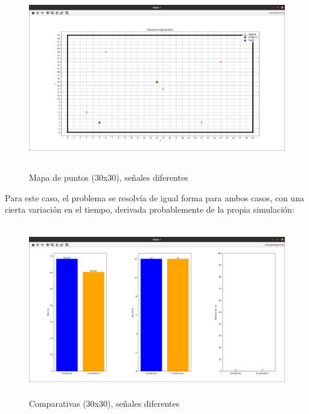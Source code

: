 \begin{figure} [H]
    \begin{center}
    \includegraphics[height=8cm]{imagenes/cap4/25_mapa_p_diff.png}
    \end{center}
    \caption[Mapa de puntos (30x30), señales diferentes]{Mapa de puntos (30x30), señales diferentes}
    \label{fig:map_p_diff_30}
\end{figure}

Para este caso, el problema se resolvía de igual forma para ambos casos, con una cierta variación en el tiempo, derivada probablemente de la propia simulación:\\

\begin{figure} [H]
    \begin{center}
    \includegraphics[height=7.5cm]{imagenes/cap4/26_comp_diff.png}
    \end{center}
    \caption[Comparativas (30x30), señales diferentes]{Comparativas (30x30), señales diferentes}
    \label{fig:comp_diff_30}
\end{figure}

